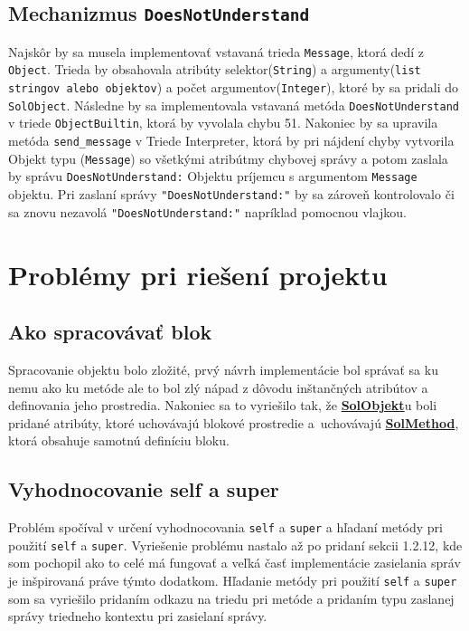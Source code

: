 \documentclass[a4paper, 11pt]{article}
\begin{document}
        \subsection{Mechanizmus \texttt{DoesNotUnderstand}}
        Najskôr by sa musela implementovať vstavaná trieda \texttt{Message}, ktorá dedí z \texttt{Object}. 
        Trieda by obsahovala atribúty selektor(\texttt{String}) a argumenty(\texttt{list stringov alebo objektov}) a počet argumentov(\texttt{Integer}), ktoré by sa pridali do \texttt{SolObject}. 
        Následne by sa implementovala vstavaná metóda \texttt{DoesNotUnderstand} v triede \texttt{ObjectBuiltin}, ktorá by vyvolala chybu 51.
        Nakoniec by sa upravila metóda \texttt{send\_message} v Triede Interpreter, ktorá by pri nájdení chyby vytvorila Objekt typu (\texttt{Message}) so všetkými atribútmy chybovej správy a potom zaslala by správu \texttt{DoesNotUnderstand:} Objektu príjemcu s argumentom \texttt{Message} objektu.
        Pri zaslaní správy \texttt{"DoesNotUnderstand:"} by sa zároveň kontrolovalo či sa znovu nezavolá \texttt{"DoesNotUnderstand:"} napríklad pomocnou vlajkou.
    
        \section{Problémy pri riešení projektu}
        \subsection{Ako spracovávať blok}
        Spracovanie objektu bolo zložité, prvý návrh implementácie bol správať sa ku nemu ako ku metóde ale to bol zlý nápad z dôvodu inštančných atribútov a definovania jeho prostredia.
        Nakoniec sa to vyriešilo tak, že \hyperref[solobject]{\textbf{SolObjekt}}u boli pridané atribúty, ktoré uchovávajú blokové prostredie a~uchovávajú \hyperref[solmethod]{\textbf{SolMethod}}, ktorá obsahuje samotnú definíciu bloku.

        \subsection{Vyhodnocovanie self a super}
        Problém spočíval v určení vyhodnocovania \texttt{self} a \texttt{super} a hľadaní metódy pri použití \texttt{self} a \texttt{super}.
        Vyriešenie problému nastalo až po pridaní sekcii 1.2.12, kde som pochopil ako to celé má fungovať a veľká časť implementácie zasielania správ je inšpirovaná práve týmto dodatkom.
        Hľadanie metódy pri použití \texttt{self} a \texttt{super} som sa vyriešilo pridaním odkazu na triedu pri metóde a pridaním typu zaslanej správy triedneho kontextu pri zasielaní správy.
\end{document}
